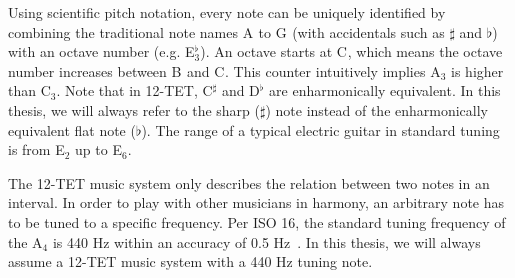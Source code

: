 \documentclass[10pt,twocolumn]{article}
\newcommand{\note}[2]{#1${}_{#2}$}
\newcommand{\notesharp}[2]{#1${}_{#2}^{\sharp}$}
\newcommand{\noteflat}[2]{#1${}_{#2}^{\flat}$}
\begin{document}
Using scientific pitch notation, every note can be uniquely identified by combining the traditional note names \note{A}{} to \note{G}{} (with accidentals such as $\sharp$ and $\flat$) with an octave number (e.g. \noteflat{E}{3}). An octave starts at \note{C}{}, which means the octave number increases between \note{B}{} and \note{C}{}. This counter intuitively implies \note{A}{3} is higher than \note{C}{3}. Note that in 12-TET, \notesharp{C}{} and \noteflat{D}{} are enharmonically equivalent. In this thesis, we will always refer to the sharp ($\sharp$) note instead of the enharmonically equivalent flat note ($\flat$). %
The range of a typical electric guitar in standard tuning is from \note{E}{2} up to \note{E}{6}.

The 12-TET music system only describes the relation between two notes in an interval. In order to play with other musicians in harmony, an arbitrary note has to be tuned to a specific frequency. Per ISO 16, the standard tuning frequency of the \note{A}{4} is 440 Hz within an accuracy of 0.5 Hz~\cite{isoa}. In this thesis, we will always assume a 12-TET music system with a 440 Hz tuning note.
\end{document}
